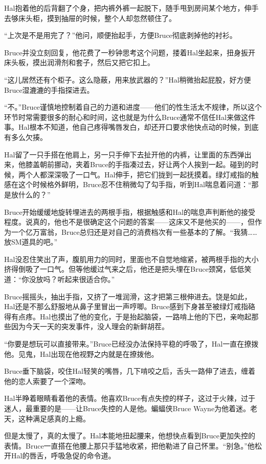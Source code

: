 \documentclass[../main.tex]{subfiles}
\begin{document}
Hal抱着他的后背翻了个身，把内裤外裤一起脱下，随手甩到房间某个地方，伸手去够床头柜，摸到抽屉的时候，整个人却忽然顿住了。

“上次是不是用完了？”他问，顺便抬起手，方便Bruce彻底剥掉他的衬衫。

Bruce并没立刻回复，他花费了一秒钟思考这个问题，搂着Hal坐起来，扭身扳开床头板，摸出润滑剂和套子，然后又把它扣上。

“这儿居然还有个柜子。这么隐蔽，用来放武器的？”Hal稍微抬起屁股，好方便Bruce湿漉漉的手指探进去。

“不。”Bruce谨慎地控制着自己的力道和进度——他们的性生活太不规律，所以这个环节时常需要很多的耐心和时间，这也就是为什么Bruce通常不信任Hal来做这件事。Hal根本不知道，他自己疼得嘴唇发白，却还开口要求他快点动的时候，到底有多么欠揍。

Hal留了一只手搭在他肩上，另一只手伸下去扯开他的内裤，让里面的东西弹出来，他膝盖朝前挪动，夹着Bruce的手指凑过去，好让两个人挨到一起。碰到的时候，两个人都深深吸了一口气。Hal伸手，把它们拢到一起抚摸着。绿灯戒指的触感在这个时候格外鲜明，Bruce忍不住稍微勾了勾手指，听到Hal喘息着问道：“那是放什么的？”

Bruce开始缓缓地旋转埋进去的两根手指，根据触感和Hal的喘息声判断他的接受程度。说真的，他也不是很确定这个问题的答案——这床又不是他买的——，但作为一个亿万富翁，Bruce总归还是对自己的消费档次有一些基本的了解。“我猜\ldots\ldots 放SM道具的吧。”

Hal没忍住笑出了声，腹肌用力的同时，里面也不自觉地缩紧，被两根手指的大小挤得倒吸了一口气。但等他缓过气来之后，他还是把头埋在Bruce颈窝，低低笑道：“你没放吗？听起来很适合你。”

Bruce摇摇头，抽出手指，又挤了一堆润滑，这才把第三根伸进去。饶是如此，Hal还是不那么舒服地从鼻子里冒出一声哼唧。Bruce感到下身甚至被绿灯戒指硌得有点疼。Hal也摸出了他的变化，于是抬起脑袋，一路啃上他的下巴，亲吻起那些因为今天一天的突发事件，没人理会的新鲜胡茬。

“你要是想玩可以直接带来。”Bruce已经没办法保持平稳的呼吸了，Hal一直在撩拨他。见鬼，Hal出现在他视野之内就是在撩拨他。

Bruce垂下脑袋，咬住Hal轻笑的嘴唇，几下啃咬之后，舌头一路伸了进去，缠着他的恋人索要了一个深吻。

Hal半睁着眼睛看着他的表情。他喜欢Bruce有点失控的样子，这过于火辣，过于迷人，最重要的是——让Bruce失控的人是他。蝙蝠侠Bruce
Wayne为他着迷。老天，这种满足感真的上瘾。

但是太慢了，真的太慢了。Hal本能地扭起腰来，他想快点看到Bruce更加失控的表情。Bruce一直搭在他腰上那只手猛地收紧，把他勒进了自己怀里。“别急。”他松开Hal的唇舌，呼吸急促的命令道。
\end{document}
